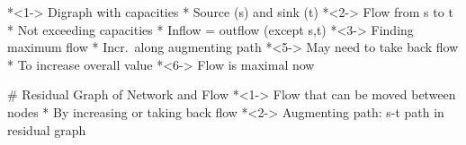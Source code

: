 \documentclass[fleqn]{beamer}
\begin{document}
{\begin{minipage}{.49\textwidth}
  \end{minipage}
  \begin{minipage}{.49\textwidth}
    *<1-> Digraph with capacities
      * Source (s) and sink (t)
    *<2-> Flow from s to t
      * Not exceeding capacities
      * Inflow = outflow (except s,t)
    *<3-> Finding maximum flow
      * Incr.\ along augmenting path
    *<5-> May need to take back flow
      * To increase overall value
    *<6-> Flow is maximal now
  
  \end{minipage}

\def\resgraph{
    \draw[resgp, bend left] (s) to node[resgp] {4} (b);
    \draw[resga, bend left] (b) to node[resga] {1} (s);
    \draw[resga] (a) to node[resga] {3} (s);
    \draw[resgp] (a) to node[resgp] {6} (c);
    \draw[resgp] (c) to node[resgp] {4} (t);
    \draw[resgp, bend left] (b) to node[resgp] {2} (d);
    \draw[resga, bend left] (d) to node[resgp] {1} (b);
    \draw[resga] (t) to node[resga] {4} (d);
    \draw[resga] (d) to node[resga] {3} (a);
}

\def\augpathres{
  \draw[aug, bend left] (s) to (b);
  \draw[aug, bend left] (b) to (d);
  \draw[aug] (d) to (a);
  \draw[aug] (a) to (c);
  \draw[aug] (c) to (t);
}


# Residual Graph 
  {of Network and Flow}
  *<1-> Flow that can be moved between nodes
    * By \textcolor{parval}{increasing} or \textcolor{aparval}{taking back} flow
  *<2-> Augmenting path: s-t path in residual graph  

    
}  
\end{document}
